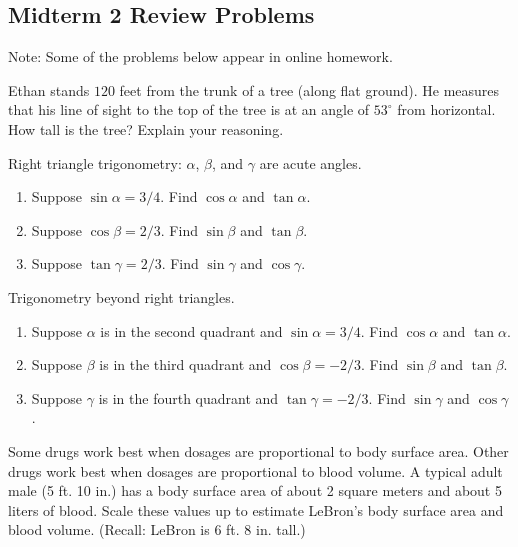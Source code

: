 \subsection{Midterm 2 Review Problems}
Note: Some of the problems below appear in online homework.

\begin{prob}
Ethan stands $120$ feet from the trunk of a tree (along flat ground).  He measures that his line of sight to the top of the tree is at an angle of $53^\circ$ from horizontal.  How tall is the tree?  Explain your reasoning.  
\end{prob}


\begin{prob}
Right triangle trigonometry: $\alpha$, $\beta$, and $\gamma$ are acute angles.  
\begin{enumerate}
\item Suppose $\sin\alpha = 3/4$.  Find $\cos\alpha$ and $\tan\alpha$.
\item Suppose $\cos\beta = 2/3$.  Find $\sin\beta$ and $\tan\beta$.
\item Suppose $\tan\gamma = 2/3$.  Find $\sin\gamma$ and $\cos\gamma$.
\end{enumerate}
\end{prob}

\begin{prob}
Trigonometry beyond right triangles.  
\begin{enumerate}
\item Suppose $\alpha$ is in the second quadrant and $\sin\alpha = 3/4$.  Find $\cos\alpha$ and $\tan\alpha$.
\item Suppose $\beta$ is in the third quadrant and $\cos\beta = -2/3$.  Find $\sin\beta$ and $\tan\beta$.
\item Suppose $\gamma$ is in the fourth quadrant and $\tan\gamma = -2/3$.  Find $\sin\gamma$ and $\cos\gamma$.
\end{enumerate}
\end{prob}


\begin{prob}
Some drugs work best when dosages are proportional to body surface area.  Other drugs work best when dosages are proportional to blood volume.  A typical adult male (5 ft. 10 in.)  has a body surface area of about 2 square meters and about 5 liters of blood.  Scale these values up to estimate LeBron's body surface area and blood volume.  (Recall: LeBron is 6 ft. 8 in. tall.)
\end{prob}

